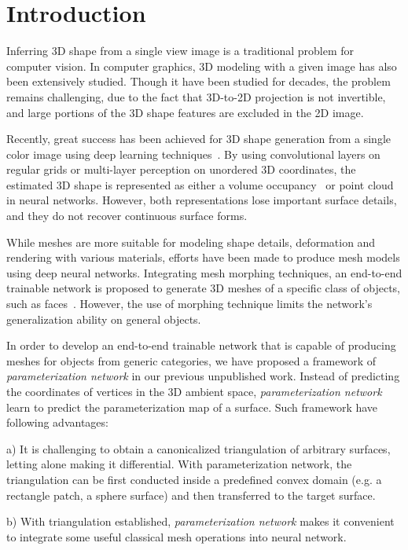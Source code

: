\section{Introduction}
Inferring 3D shape from a single view image is a traditional problem for computer vision. In computer graphics, 3D modeling with a given image has also been extensively studied. 
Though it have been studied for decades, the problem remains challenging, due to the fact that 3D-to-2D projection is not invertible, and large portions of the 3D shape features are excluded in the 2D image. 

Recently, great success has been achieved for 3D shape generation from a single color image using deep learning techniques~\cite{3DR2N2,PSGN}. 
By using convolutional layers on regular grids or multi-layer
perception on unordered 3D coordinates, the estimated 3D shape is represented
as either a volume occupancy~\cite{3DR2N2} or point cloud~\cite{PSGN} in neural networks. 
However, both representations lose important surface details, and they do not recover continuous surface forms.

While meshes are more suitable for modeling shape details, deformation and rendering with various materials, efforts have been made to produce mesh models using deep neural networks. 
Integrating mesh morphing techniques, an end-to-end trainable network is proposed to generate 3D meshes of a specific class of objects, such as faces~\cite{endface}.
However, the use of morphing technique limits the network's generalization ability on general objects.
%

In order to develop an end-to-end trainable network that is capable of producing meshes for objects from generic categories, we have proposed a framework of \emph{parameterization network} in our previous unpublished work. Instead of predicting the coordinates of vertices in the 3D ambient space, \emph{parameterization network} learn to predict the parameterization map of a surface.
Such framework have following advantages:

a) It is challenging to obtain a canonicalized triangulation of arbitrary surfaces, letting alone making it differential. With parameterization network, the triangulation can be first conducted inside a predefined convex domain (e.g. a rectangle patch, a sphere surface) and then transferred to the target surface.

b) With triangulation established, \emph{parameterization network} makes it convenient to integrate some useful classical mesh operations into neural network.

